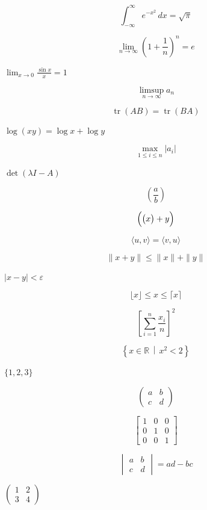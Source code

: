 \documentclass{article}
\begin{document}
\newpage
\[
\int_{-\infty}^{\infty} e^{-x^2}\,dx = \sqrt{\pi}
\]
\par
\newpage
\[
\lim_{n \to \infty} \left(1 + \frac{1}{n}\right)^{n} = e
\]
\par
\newpage
$
\lim_{x \to 0} \frac{\sin x}{x} = 1
$
\par
\newpage
\[
\limsup_{n \to \infty} a_n
\]
\par
\newpage
\[
\operatorname{tr}(AB) = \operatorname{tr}(BA)
\]
\par
\newpage
$
\log(xy) = \log x + \log y
$
\par
\newpage
\[
\max_{1 \le i \le n} |a_i|
\]
\par
\newpage
$
\det(\lambda I - A)
$
\par
\newpage
\[
\left( \frac{a}{b} \right)
\]
\par
\newpage
\[
\Bigl( \bigl( x \bigr) + y \Bigr)
\]
\par
\newpage
\[
\langle u, v \rangle = \langle v, u \rangle
\]
\par
\newpage
\[
\| x + y \| \le \| x \| + \| y \|
\]
\par
\newpage
$
|x - y| < \varepsilon
$
\par
\newpage
\[
\lfloor x \rfloor \le x \le \lceil x \rceil
\]
\par
\newpage
\[
\left[ \sum_{i=1}^{n} \frac{x_i}{n} \right]^{2}
\]
\par
\newpage
\[
\left\{ x \in \mathbb{R} \,\middle|\, x^2 < 2 \right\}
\]
\par
\newpage
$
\{1, 2, 3\}
$
\par
\newpage
\[
\begin{pmatrix} a & b \\ c & d \end{pmatrix}
\]
\par
\newpage
\[
\begin{bmatrix} 1 & 0 & 0 \\ 0 & 1 & 0 \\ 0 & 0 & 1 \end{bmatrix}
\]
\par
\newpage
\[
\begin{vmatrix} a & b \\ c & d \end{vmatrix} = ad - bc
\]
\par
\newpage
$
\left(\begin{smallmatrix} 1 & 2 \\ 3 & 4 \end{smallmatrix}\right)
$
\par
\end{document}
